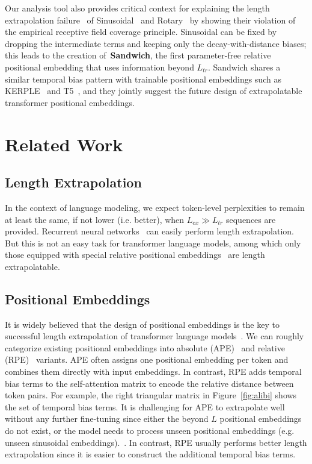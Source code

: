 \documentclass[11pt]{article}
\theoremstyle{plain}
\begin{document}
Our analysis tool also provides critical context for explaining the length extrapolation failure~\cite{press2022train,chi2022kerple} of Sinusoidal~\cite{vaswani2017attention} and Rotary~\cite{su2021roformer} by showing their violation of the empirical receptive field coverage principle.
Sinusoidal can be fixed by dropping the intermediate terms and keeping only the decay-with-distance biases; this leads to the creation of~\textbf{Sandwich}, the first parameter-free relative positional embedding that uses information beyond  $L_{tr}$. Sandwich shares a similar temporal bias pattern with trainable positional embeddings such as KERPLE~\cite{chi2022kerple} and T5~\cite{raffel2019exploring}, and they jointly suggest the future design of extrapolatable transformer positional embeddings.

\section{Related Work}
\subsection{Length Extrapolation}
\label{sec:related_le}
In the context of language modeling, we expect token-level perplexities to remain at least the same, if not lower (i.e. better), when $L_{ex}\gg L_{tr}$ sequences are provided. 
Recurrent neural networks~\cite{MikolovKBCK10,6424228,zaremba2014recurrent} can easily perform length extrapolation. 
But this is not an easy task for transformer language models, among which only those equipped with special relative positional embeddings~\cite{press2022train, chi2022kerple} are length extrapolatable.

\subsection{Positional Embeddings}
It is widely believed that the design of positional embeddings is the key to successful length extrapolation of transformer language models~\cite{press2022train,chi2022kerple}. We can roughly categorize existing positional embeddings into absolute (APE)~\cite{vaswani2017attention} and relative (RPE)~\cite{su2021roformer,raffel2019exploring,press2022train,chi2022kerple} variants. 
APE often assigns one positional embedding per token and combines them directly with input embeddings. 
In contrast, RPE adds temporal bias terms to the self-attention matrix to encode the relative distance between token pairs. For example, the right triangular matrix in Figure~\ref{fig:alibi} shows the set of temporal bias terms.
It is challenging for APE to extrapolate well without any further fine-tuning since either the beyond $L$ positional embeddings do not exist, or the model needs to process unseen positional embeddings (e.g. unseen sinusoidal embeddings).~\cite{press2022train,chi2022kerple}. In contrast, RPE usually performs better length extrapolation since it is easier to construct the additional temporal bias terms.
\end{document}
